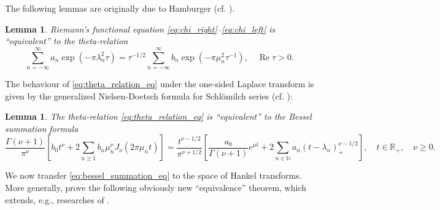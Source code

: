 \documentclass[11pt]{article}
\theoremstyle{plain}
\newtheorem{lemma}[theorem]{Lemma}
\begin{document}
The following lemmas are originally due to Hamburger (cf. \cite{4,11,19}).

\begin{lemma}
\label{lem:theta_relation}
Riemann's functional equation \eqref{eq:chi_right}--\eqref{eq:chi_left} is ``equivalent'' to the theta-relation
\begin{equation}
\sum_{n=-\infty}^{\infty} a_n \exp(-\pi \lambda_n^2 \tau) = \tau^{-1/2} \sum_{n=-\infty}^{\infty} b_n \exp(-\pi \mu_n^2 \tau^{-1}), \quad \operatorname{Re} \tau > 0.
\label{eq:theta_relation_eq}
\end{equation}
\end{lemma}

The behaviour of \eqref{eq:theta_relation_eq} under the one-sided Laplace transform is given by the generalized Nielsen-Doetsch formula for Schlömilch series (cf. \cite{11,15,16,23,24,31}):

\begin{lemma}
\label{lem:bessel_summation}
The theta-relation \eqref{eq:theta_relation_eq} is ``equivalent'' to the Bessel summation formula
\begin{equation}
\frac{\Gamma(\nu+1)}{\pi^{\nu}} \left[ b_0 t^\nu + 2\sum_{n \geq 1} b_n \mu_n^\nu J_\nu(2\pi \mu_n t) \right]
= \frac{t^{\nu-1/2}}{\pi^{\nu+1/2}} \left[ \frac{a_0}{\Gamma(\nu+1)} e^{\mu t} + 2 \sum_{n \in \mathbb{N}} a_n (t - \lambda_n)_+^{\nu-1/2} \right], \quad t \in \mathbb{R}_+, \quad \nu \geq 0.
\label{eq:bessel_summation_eq}
\end{equation}
\end{lemma}

We now transfer \eqref{eq:bessel_summation_eq} to the space of Hankel transforms. More generally, prove the following obviously new ``equivalence'' theorem, which extends, e.g., researches of \cite{11}.
\end{document}
